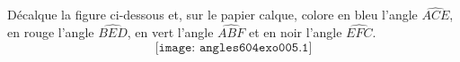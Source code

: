 Décalque la figure ci-dessous et, sur le papier calque, colore en bleu l'angle $\widehat{ACE}$, en rouge l'angle $\widehat{BED}$, en vert l'angle $\widehat{ABF}$ et en noir l'angle $\widehat{EFC}$.
\[\texttt{[image: angles604exo005.1]}\]

